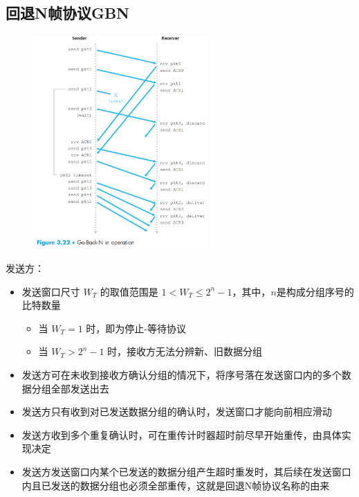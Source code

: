 \documentclass[cs4size,a4paper,10pt]{ctexart}
\begin{document}
	\subsection{回退N帧协议GBN}
	\begin{figure}[H]
		\centering
		\includegraphics[width=0.6\textwidth]{img/3.2.3}
	\end{figure}

	发送方：
	\begin{itemize}
		\item 发送窗口尺寸 $W_T$ 的取值范围是 $1<W_T\leq2^n-1$，其中，$n$​​ 是构成分组序号的比特数量
		\begin{itemize}
			\item 当 $W_T=1$ 时，即为停止-等待协议
			\item 当 $W_T>2^n-1$ 时，接收方无法分辨新、旧数据分组
		\end{itemize}
		\item 发送方可在未收到接收方确认分组的情况下，将序号落在发送窗口内的多个数据分组全部发送出去
		\item 发送方只有收到对已发送数据分组的确认时，发送窗口才能向前相应滑动
		\item 发送方收到多个重复确认时，可在重传计时器超时前尽早开始重传，由具体实现决定
		\item 发送方发送窗口内某个已发送的数据分组产生超时重发时，其后续在发送窗口内且已发送的数据分组也必须全部重传，这就是回退N帧协议名称的由来
	\end{itemize}
\end{document}
